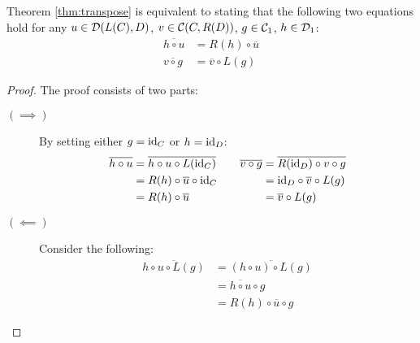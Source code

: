 \begin{theorem}
  Theorem \ref{thm:transpose} is equivalent to stating that the following two
  equations hold for any $u\in \mathcal{D}(L(C), D)$, $v\in \mathcal{C}(C, R(D))$,
  $g \in \mathcal{C}_1$, $h\in \mathcal{D}_1$:
  \begin{align*}
    \overline{h\circ u} &= R(h) \circ \overline{u}\\
    \overline{v\circ g} &= \overline{v} \circ L(g)
  \end{align*}

  \begin{proof}
    The proof consists of two parts:
    \begin{description}
      \item[$(\implies)$] By setting either $g=\mathrm{id}_C$ or $h=\mathrm{id}_D$:
        \[
          \begin{aligned}
            \overline{h\circ u}
              &= \overline{h\circ u \circ L(\mathrm{id}_C)}\\
              &= R(h) \circ \overline{u} \circ \mathrm{id}_C\\
              &= R(h) \circ \overline{u}
          \end{aligned}
          \qquad
          \begin{aligned}
            \overline{v\circ g}
              &= \overline{R(\mathrm{id}_D)\circ v\circ g}\\
              &= \mathrm{id}_D \circ \overline{v} \circ L(g)\\
              &= \overline{v} \circ L(g)
          \end{aligned}
        \]
      \item[$(\impliedby)$] Consider the following:
        \[
          \begin{aligned}
            \overline{h \circ u\circ L(g)}
              &= \overline{(h \circ u)\circ L(g)}\\
              &= \overline{h\circ u} \circ g\\
              &= R(h) \circ \overline{u} \circ g
          \end{aligned}
        \]
    \end{description}
  \end{proof}
\end{theorem}

